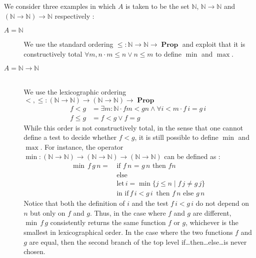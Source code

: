 \documentclass[envcountsame]{llncs}
\newcommand{\N}{\mathbb{N}}
\DeclareMathOperator{\Prop}{\mathbf{Prop}}
\begin{document}
We consider three examples in which  $A$ is taken to be the set $\N$, $\N\to\N$ and $(\N\to\N)\to\N$ respectively :
\begin{description}
\item[$A = \N$] \hfill

We use the standard ordering $\leq : \N \to \N \to \Prop$ and exploit
that it is constructively total $\forall m ,n\cdot m \leq n \lor n \leq m$ to define $\min$ and
$\max$.

\bigskip
\item[$A=\N\to\N$] \hfill\\
We use the lexicographic ordering ${<},{\leq}:(\N \to \N) \to (\N\to\N)\to\Prop$
\begin{align*}
f < g & = \exists m:\N \cdot f m < g n \wedge \forall i<m\cdot f\,i = g \,i\\
f \leq g &= f < g \vee f=g
\end{align*}
While this order is not constructively total, in the sense that one cannot define a test to decide whether $f<g$, it is still possible to define $\min$ and $\max$.
For instance, the operator $\min : (\N \to \N) \to (\N\to\N) \to (\N \to \N)$ can be defined as :
\begin{align*}
 \min\,f\,g\,n =\,&\text{if $f \,n$ = $g\,n$ then $f n$}\\
                 &\text{else }\\
                 &\text{let}\,i = \min \{ j \leq n \mid f\,j \not= g\,j \}\\
                 &\text{in }\text{if}\, f\,i< g\,i\,\text{ then } f\,n \text{ else } g\,n
\end{align*}
Notice that both the definition of $i$ and the test $f\,i< g\,i$ do not depend on $n$ but only on $f$ and $g$.  Thus, in the case where $f$ and $g$ are different, $\min\,f\,g$ consistently returns the same function $f$ or $g$, whichever is the smallest in lexicographical order. In the case where the two functions $f$ and $g$ are equal, then the second branch of the top level if\dots then\dots else\dots is never chosen.


\end{description}
\end{document}

